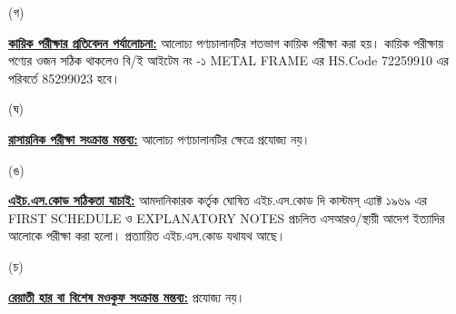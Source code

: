 \documentclass[12pt]{article}
\begin{document}
\begin{minipage}[t]{0.05\linewidth}
\hspace{1em}
\end{minipage}
\begin{minipage}[t]{0.05\linewidth}
(গ)
\end{minipage}
\begin{minipage}[t]{0.90\linewidth}
\underline{\textbf{কায়িক পরীক্ষার প্রতিবেদন পর্যালোচনা:}}
আলোচ্য পণ্যচালানটির শতভাগ কায়িক পরীক্ষা করা হয়। কায়িক পরীক্ষায় পণ্যের ওজন সঠিক থাকলেও বি/ই আইটেম নং -১ METAL FRAME এর HS.Code 72259910 এর পরিবর্তে 85299023 হবে।
\\
\end{minipage}
\begin{minipage}[t]{0.05\linewidth}
\hspace{1em}
\end{minipage}
\begin{minipage}[t]{0.05\linewidth}
(ঘ)
\end{minipage}
\begin{minipage}[t]{0.90\linewidth}
\underline{\textbf{রাসায়নিক পরীক্ষা সংক্রান্ত মন্তব্য:}}
আলোচ্য পণ্যচালানটির ক্ষেত্রে প্রযোজ্য নয়।
\\
\end{minipage}
\begin{minipage}[t]{0.05\linewidth}
\hspace{1em}
\end{minipage}
\begin{minipage}[t]{0.05\linewidth}
(ঙ)
\end{minipage}
\begin{minipage}[t]{0.90\linewidth}
\underline{\textbf{এইচ.এস.কোড সঠিকতা যাচাই:}}
আমদানিকারক কর্তৃক ঘোষিত এইচ.এস.কোড দি কাস্টমস্ এ্যাক্ট ১৯৬৯ এর FIRST SCHEDULE ও
EXPLANATORY NOTES প্রচলিত এসআরও/স্থায়ী আদেশ ইত্যাদির আলোকে পরীক্ষা করা হলো।
প্রত্যায়িত এইচ.এস.কোড যথাযথ আছে।
\\
\end{minipage}
\newpage
\noindent
\begin{minipage}[t]{0.05\linewidth}
\hspace{1em}
\end{minipage}
\begin{minipage}[t]{0.05\linewidth}
(চ)
\end{minipage}
\begin{minipage}[t]{0.90\linewidth}
\underline{\textbf{রেয়াতী হার বা বিশেষ মওকুফ সংক্রান্ত মন্তব্য:}}
প্রযোজ্য নয়।
\\
\end{minipage}
\end{document}
